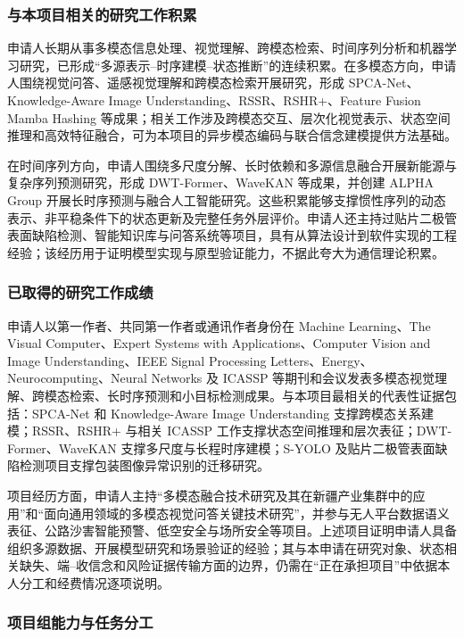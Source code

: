 \justifying
\NSFCBodyText

\subsubsection{与本项目相关的研究工作积累}

申请人长期从事多模态信息处理、视觉理解、跨模态检索、时间序列分析和机器学习研究，已形成“多源表示--时序建模--状态推断”的连续积累。在多模态方向，申请人围绕视觉问答、遥感视觉理解和跨模态检索开展研究，形成 SPCA-Net、Knowledge-Aware Image Understanding、RSSR、RSHR+、Feature Fusion Mamba Hashing 等成果；相关工作涉及跨模态交互、层次化视觉表示、状态空间推理和高效特征融合，可为本项目的异步模态编码与联合信念建模提供方法基础。

在时间序列方向，申请人围绕多尺度分解、长时依赖和多源信息融合开展新能源与复杂序列预测研究，形成 DWT-Former、WaveKAN 等成果，并创建 ALPHA Group 开展长时序预测与融合人工智能研究。这些积累能够支撑惯性序列的动态表示、非平稳条件下的状态更新及完整任务外层评价。申请人还主持过贴片二极管表面缺陷检测、智能知识库与问答系统等项目，具有从算法设计到软件实现的工程经验；该经历用于证明模型实现与原型验证能力，不据此夸大为通信理论积累。

\subsubsection{已取得的研究工作成绩}

申请人以第一作者、共同第一作者或通讯作者身份在 Machine Learning、The Visual Computer、Expert Systems with Applications、Computer Vision and Image Understanding、IEEE Signal Processing Letters、Energy、Neurocomputing、Neural Networks 及 ICASSP 等期刊和会议发表多模态视觉理解、跨模态检索、长时序预测和小目标检测成果。与本项目最相关的代表性证据包括：SPCA-Net 和 Knowledge-Aware Image Understanding 支撑跨模态关系建模；RSSR、RSHR+ 与相关 ICASSP 工作支撑状态空间推理和层次表征；DWT-Former、WaveKAN 支撑多尺度与长程时序建模；S-YOLO 及贴片二极管表面缺陷检测项目支撑包装图像异常识别的迁移研究。

项目经历方面，申请人主持“多模态融合技术研究及其在新疆产业集群中的应用”和“面向通用领域的多模态视觉问答关键技术研究”，并参与无人平台数据语义表征、公路沙害智能预警、低空安全与场所安全等项目。上述项目证明申请人具备组织多源数据、开展模型研究和场景验证的经验；其与本申请在研究对象、状态相关缺失、端--收信念和风险证据传输方面的边界，仍需在“正在承担项目”中依据本人分工和经费情况逐项说明。

\subsubsection{项目组能力与任务分工}

